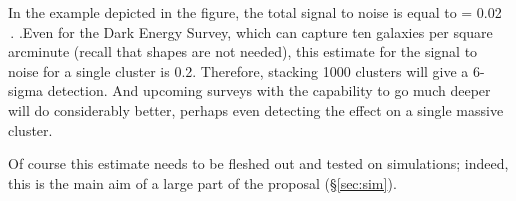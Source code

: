 
In the example depicted in the figure, the total signal to noise is
equal to \be {} = 0.02 
\,.  .\ee Even for the Dark Energy
Survey, which can capture ten galaxies per square arcminute (recall that
shapes are not needed), this estimate for the signal to noise for a single cluster is
0.2. Therefore, stacking 1000 clusters will give a 6-sigma
detection. And upcoming surveys with the capability to go much deeper
will do considerably better, perhaps even detecting the effect on a
single massive cluster.

Of course this estimate needs to be fleshed out and tested on simulations; 
indeed, this is the main aim of a large part of the proposal (\S\ref{sec:sim}).






